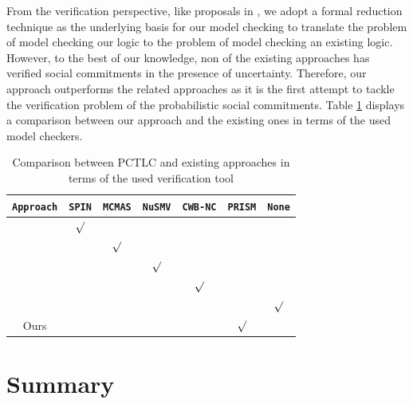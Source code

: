 From the verification perspective, like proposals in \cite{El-Menshawy2011b,El-Menshawy2013a,El-Menshawy2013b}, we adopt a formal reduction technique as the underlying basis for our model checking to translate the problem of model checking our logic to the problem of model checking an existing logic. However, to the best of our knowledge, non of the existing approaches has verified social commitments in the presence of uncertainty. Therefore, our approach outperforms the related approaches as it is the first attempt to  tackle the verification problem of the probabilistic social commitments. Table \ref{table:comparison3} displays a comparison between our approach and the existing ones in terms of the used model checkers.

\begin{table}
\centering \caption{Comparison between PCTLC and existing approaches in terms of the used verification tool} \label{table:comparison3}
\begin{tabular}{|c|c|c|c|c|c|c|}
\hline
\texttt{Approach}       & \texttt{SPIN}   & \texttt{MCMAS} & \texttt{NuSMV} & \texttt{CWB-NC}     & \texttt{PRISM} &\texttt{None}\\
\hline
\hline
\cite{Cheng2006,Desai2007}    &$\surd$          & & & & &\\
\hline
\cite{Bentahar2012,El-Menshawy2010,El-Menshawy2011b,El-Menshawy2011a,Gerard2013}       &          &$\surd$  && && \\
\hline
\cite{El-Menshawy2010,El-Menshawy2011b,El-Menshawy2013a,Telang2012}  &          &  &$\surd$ & &&\\
\hline
\cite{El-Menshawy2013b}      &          & &  &$\surd$ &&\\
\hline
\cite{Bentahar2004,Bentahar2007,Singh2000,Witwicki2007,Witwicki2009}      &      &    &   && &$\surd$\\
\hline
Ours                     &   &  & & &$\surd$ & \\
\hline


\end{tabular}
\end{table}




\section{Summary}\label{sec:conclusion-cha3}


